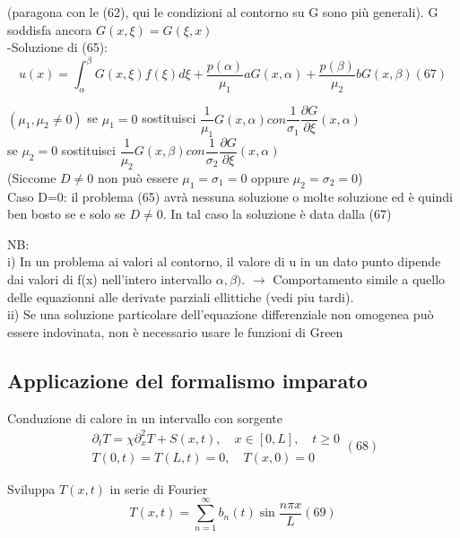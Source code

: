 \documentclass[a4paper,11pt]{report}
\begin{document}
(paragona con le (62), qui le condizioni al contorno su G sono più generali). G soddisfa ancora $G(x,\xi)=G(\xi,x)$\\
-Soluzione di (65):
\begin{equation}
u(x)=\int_\alpha^\beta G(x,\xi)f(\xi)d\xi + \dfrac{p(\alpha)}{\mu_1}aG(x,\alpha) + \dfrac{p(\beta)}{\mu_2}bG(x,\beta) (67)
\end{equation}

$(\mu_1,\mu_2\neq 0)$
se $\mu_1=0$ sostituisci $\dfrac{1}{\mu_1}G(x,\alpha) con \dfrac{1}{\sigma_1}\dfrac{\partial G}{\partial \xi}(x,\alpha)$\\
se $\mu_2=0$ sostituisci $\dfrac{1}{\mu_2}G(x,\beta) con \dfrac{1}{\sigma_2}\dfrac{\partial G}{\partial \xi}(x,\alpha)$\\
(Siccome $D\neq 0$ non può essere $\mu_1=\sigma_1=0$ oppure $\mu_2=\sigma_2=0$)\\
Caso D=0: il problema (65) avrà nessuna soluzione o molte soluzione ed è quindi ben bosto se e solo se $D\neq 0$. In tal caso la soluzione è data dalla (67)

NB:\\
i) In un problema ai valori al contorno, il valore di u in un dato punto dipende dai valori di f(x) nell'intero intervallo $\alpha,\beta)$. $\rightarrow$ Comportamento simile a quello delle equazionni alle derivate parziali ellittiche (vedi piu tardi).\\ %
ii) Se una soluzione particolare dell'equazione differenziale non omogenea può essere indovinata, non è necessario usare le funzioni di Green

\subsection{Applicazione del formalismo imparato}
Conduzione di calore in un intervallo con sorgente
\begin{equation}
\begin{matrix}
\partial_t T = \chi \partial_x^2 T + S(x,t), \quad x \in [0,L], \quad t\geq 0\\
T(0,t)=T(L,t)=0, \quad T(x,0)=0
\end{matrix} (68)
\end{equation}

Sviluppa $T(x,t)$ in serie di Fourier
\begin{equation}
T(x,t)=\sum_{n=1}^\infty b_n(t)\sin\dfrac{n\pi x}{L} (69)
\end{equation}
\end{document}
